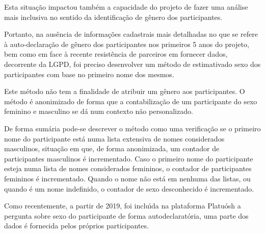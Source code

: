 \documentclass[
12pt,		%
openright,	%
twoside,  %
a4paper,			%
chapter=TITLE,		%
english,			%
french,				%
spanish,			%
brazil				%
]{USPSC-classe/USPSC}
\begin{document}
Esta situa\c{c}\~ao impactou tamb\'em a capacidade do projeto de fazer uma an\'alise mais inclusiva no sentido da identifica\c{c}\~ao de g\^enero dos participantes.









Portanto, na aus\^encia de informa\c{c}\~oes cadastrais mais detalhadas no que se refere \`a auto-declara\c{c}\~ao de g\^enero dos participantes nos primeiros 5 anos do projeto, bem como em face \`a recente resist\^encia de parceiros em fornecer dados, decorrente da LGPD, foi preciso desenvolver um m\'etodo de \textquotedbl estimativa\textquotedbl  do sexo dos participantes com base no primeiro nome dos mesmos.









Este m\'etodo n\~ao tem a finalidade de atribuir um g\^enero aos participantes. O m\'etodo \'e anonimizado de forma que a contabiliza\c{c}\~ao de um participante do sexo feminino e masculino se d\'a num contexto n\~ao personalizado.









De forma sum\'aria pode-se descrever o m\'etodo como uma verifica\c{c}\~ao se o primeiro nome do participante est\'a numa lista extensiva de nomes \textquotedbl considerados masculinos\textquotedbl , situa\c{c}\~ao em que, de forma anonimizada, um contador de participantes masculinos \'e incrementado. Caso o primeiro nome do participante esteja numa lista de nomes \textquotedbl considerados femininos\textquotedbl , o contador de participantes femininos \'e incrementado. Quando o nome n\~ao est\'a em nenhuma das listas, ou quando \'e um nome indefinido, o contador de \textquotedbl sexo desconhecido \'e incrementado\textquotedbl .









Como recentemente, a partir de 2019, foi inclu\'{\i}da na plataforma Platu\'osh a pergunta sobre sexo do participante de forma autodeclarat\'oria, uma parte dos dados \'e fornecida pelos pr\'oprios participantes.
\end{document}
